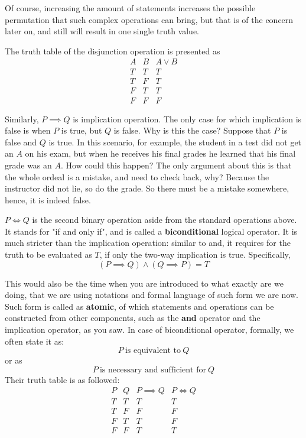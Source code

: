 Of course, increasing the amount of statements increases the possible permutation that such complex operations can bring, but that is of the concern later on, and still will result in one single truth value. 

The truth table of the disjunction operation is presented as
$$\begin{array}{|c|c|c|}
A & B & A\lor B \\
T  & T & T \\
T & F & T \\
F  & T & T \\
F & F & F
\end{array}$$

Similarly, $P \implies Q$ is implication operation. The only case for which implication is false is when $P$ is true, but $Q$ is false. Why is this the case? Suppose that $P$ is false and $Q$ is true. In this scenario, for example, the student in a test did not get an $A$ on his exam, but when he receives his final grades he learned that his final grade was an $A$. How could this happen? The only argument about this is that the whole ordeal is a mistake, and need to check back, why? Because the instructor did not lie, so do the grade. So there must be a mistake somewhere, hence, it is indeed false. 

$P \iff Q$ is the second binary operation aside from the standard operations above. It stands for "if and only if", and is called a \textbf{biconditional} logical operator. It is much stricter than the implication operation: similar to and, it requires for the truth to be evaluated as $T$, if only the two-way implication is true. Specifically, 
\begin{equation*}
    (P \implies Q) \land (Q \implies P) = T 
\end{equation*}

This would also be the time when you are introduced to what exactly are we doing, that we are using notations and formal language of such form we are now. Such form is called as \textbf{atomic}, of which statements and operations can be constructed from other components, such as the \textbf{and} operator and the implication operator, as you saw. In case of biconditional operator, formally, we often state it as: 
\begin{equation*}
    P \: \text{is equivalent to}\: Q
\end{equation*}
or as 
\begin{equation*}
    P\: \text{is necessary and sufficient for}\: Q
\end{equation*}
Their truth table is as followed:
$$\begin{array}{|c|c|c|c|c|}
P & Q & P \implies Q & P \iff Q  \\
T & T & T & T  \\
T & F & F & F    \\
F & T & T & F \\
F & F & T & T 
\end{array}$$


